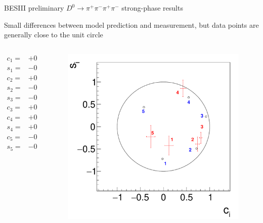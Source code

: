 \documentclass{beamer}
\begin{document}
\begin{frame}{BESIII preliminary $D^0\to\pi^+\pi^-\pi^+\pi^-$ strong-phase results}
  \begin{center}
    Small differences between model prediction and measurement, but data points are generally close to the unit circle
  \end{center}
  \vspace{-0.3cm}
  \begin{columns}
    \begin{column}{0.50\textwidth}
      \vspace{-0.5cm}
      \begin{align*}
        c_1 =& +0.12 \pm 0.09 \pm 0.02 \\
        s_1 =& -0.42 \pm 0.21 \pm 0.04 \\
        c_2 =& +0.74 \pm 0.04 \pm 0.02 \\
        s_2 =& -0.39 \pm 0.16 \pm 0.06 \\
        s_3 =& -0.25 \pm 0.12 \pm 0.03 \\
        c_3 =& +0.81 \pm 0.03 \pm 0.01 \\
        c_4 =& +0.42 \pm 0.06 \pm 0.02 \\
        s_4 =& +0.86 \pm 0.19 \pm 0.07 \\
        c_5 =& -0.27 \pm 0.09 \pm 0.03 \\
        s_5 =& -0.22 \pm 0.25 \pm 0.08
      \end{align*}
    \end{column}
    \begin{column}{0.50\textwidth}
      \begin{figure}
        \centering
        \includegraphics[width=1.0\textwidth]{Plots/CiSiOptim.pdf}

\end{figure}
\end{column}
\end{columns}
\end{frame}
\end{document}
